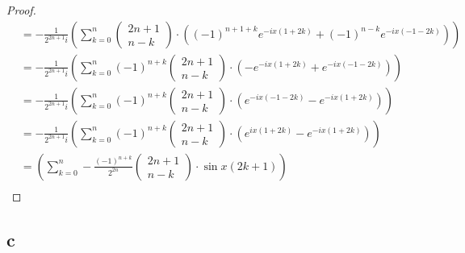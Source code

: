 \documentclass[a4paper,10pt]{article}
\begin{document}
\begin{proof}
\begin{align*}
  & = -\frac{1}{2^{2n + 1}i} \left(\sum_{k = 0}^{n} \begin{pmatrix}2n + 1\\n - k\end{pmatrix} \cdot \left( (-1)^{n + 1 + k}e^{-ix(1 + 2k)} + (-1)^{n - k}e^{-ix(-1 - 2k)} \right)\right)\\
  & = -\frac{1}{2^{2n + 1}i} \left(\sum_{k = 0}^{n} (-1)^{n + k} \begin{pmatrix}2n + 1\\n - k\end{pmatrix} \cdot \left( -e^{-ix(1 + 2k)} + e^{-ix(-1 - 2k)} \right)\right)\\
  & = -\frac{1}{2^{2n + 1}i} \left(\sum_{k = 0}^{n} (-1)^{n + k} \begin{pmatrix}2n + 1\\n - k\end{pmatrix} \cdot \left( e^{-ix(-1 - 2k)} - e^{-ix(1 + 2k)} \right)\right)\\
  & = -\frac{1}{2^{2n + 1}i} \left(\sum_{k = 0}^{n} (-1)^{n + k} \begin{pmatrix}2n + 1\\n - k\end{pmatrix} \cdot \left( e^{ix(1 + 2k)} - e^{-ix(1 + 2k)} \right)\right)\\
  & = \left(\sum_{k = 0}^{n} -\frac{(-1)^{n + k}}{2^{2n}} \begin{pmatrix}2n + 1\\n - k\end{pmatrix} \cdot \sin x(2k + 1) \right)\\
 \end{align*}
\end{proof}

\subsection*{c}
\end{document}
